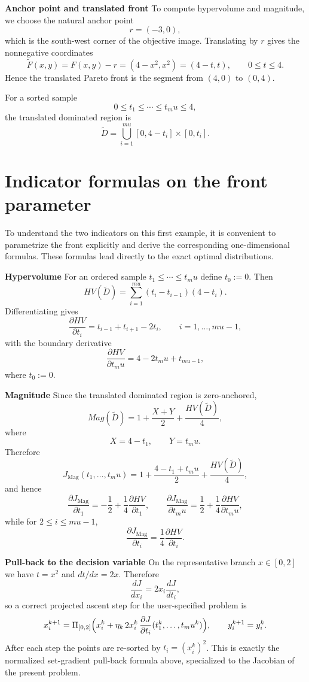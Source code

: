 \documentclass{article}
\def\mu{mu}%
\def\HV{HV}%
\def\Mag{Mag}%
\theoremstyle{definition}
\newcommand{\Mag}{\operatorname{Mag}}
\newcommand{\HV}{\operatorname{HV}}
\newcommand{\1}{\mathbf{1}}
\newcommand{\myparagraph}[1]{\medskip\noindent\textbf{#1}}
\begin{document}
\myparagraph{Anchor point and translated front}
To compute hypervolume and magnitude, we choose the natural anchor point
\[
r=(-3,0),
\]
which is the south-west corner of the objective image. Translating by $r$ gives the nonnegative coordinates
\[
\widetilde F(x,y)=F(x,y)-r=(4-x^2, x^2)=(4-t,t),
\qquad 0\le t\le 4.
\]
Hence the translated Pareto front is the segment from $(4,0)$ to $(0,4)$.

For a sorted sample
\[
0\le t_1\le\cdots\le t_\mu\le 4,
\]
the translated dominated region is
\[
\widetilde D=\bigcup_{i=1}^{\mu}[0,4-t_i]\times[0,t_i].
\]

\section{Indicator formulas on the front parameter}

To understand the two indicators on this first example, it is convenient to parametrize the front explicitly and derive the corresponding one-dimensional formulas. These formulas lead directly to the exact optimal distributions.

\myparagraph{Hypervolume}
For an ordered sample $t_1\le\cdots\le t_\mu$ define $t_0:=0$. Then
\[
\HV(\widetilde D)=\sum_{i=1}^{\mu}(t_i-t_{i-1})(4-t_i).
\]
Differentiating gives
\[
\frac{\partial \HV}{\partial t_i}=t_{i-1}+t_{i+1}-2t_i,
\qquad i=1,\dots,\mu-1,
\]
with the boundary derivative
\[
\frac{\partial \HV}{\partial t_\mu}=4-2t_\mu+t_{\mu-1},
\]
where $t_0:=0$.

\myparagraph{Magnitude}
Since the translated dominated region is zero-anchored,
\[
\Mag(\widetilde D)=1+\frac{X+Y}{2}+\frac{\HV(\widetilde D)}{4},
\]
where
\[
X=4-t_1,
\qquad
Y=t_\mu.
\]
Therefore
\[
J_{\mathrm{Mag}}(t_1,\dots,t_\mu)
=1+\frac{4-t_1+t_\mu}{2}+\frac{\HV(\widetilde D)}{4},
\]
and hence
\[
\frac{\partial J_{\mathrm{Mag}}}{\partial t_1}=-\frac12+\frac14\frac{\partial \HV}{\partial t_1},
\qquad
\frac{\partial J_{\mathrm{Mag}}}{\partial t_\mu}=\frac12+\frac14\frac{\partial \HV}{\partial t_\mu},
\]
while for $2\le i\le \mu-1$,
\[
\frac{\partial J_{\mathrm{Mag}}}{\partial t_i}=\frac14\frac{\partial \HV}{\partial t_i}.
\]

\myparagraph{Pull-back to the decision variable}
On the representative branch $x\in[0,2]$ we have $t=x^2$ and $dt/dx=2x$. Therefore
\[
\frac{dJ}{dx_i}=2x_i\frac{dJ}{dt_i},
\]
so a correct projected ascent step for the user-specified problem is
\[
x_{i}^{k+1}=\Pi_{[0,2]}\Bigl(x_i^k+\eta_k\,2x_i^k\,\frac{\partial J}{\partial t_i}(t_1^k,\dots,t_\mu^k)\Bigr),
\qquad
y_i^{k+1}=y_i^k.
\]
After each step the points are re-sorted by $t_i=(x_i^k)^2$. This is exactly the normalized set-gradient pull-back formula above, specialized to the Jacobian of the present problem.
\end{document}
